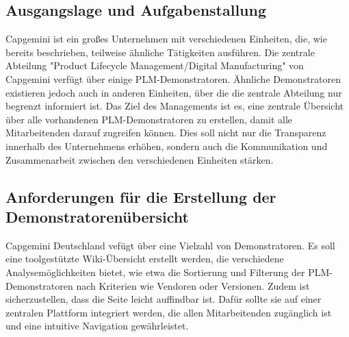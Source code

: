 \documentclass[a4paper, 12pt]{scrartcl}
\begin{document}
	\subsection{Ausgangslage und Aufgabenstallung} %
Capgemini ist ein großes Unternehmen mit verschiedenen Einheiten, die, wie bereits beschrieben, teilweise ähnliche Tätigkeiten ausführen. Die zentrale Abteilung "Product Lifecycle Management/Digital Manufacturing" von Capgemini \cite{Capgemini} verfügt über einige PLM-Demonstratoren. Ähnliche Demonstratoren existieren jedoch auch in anderen Einheiten, über die die zentrale Abteilung nur begrenzt informiert ist.\newline
Das Ziel des Managements ist es, eine zentrale Übersicht über alle vorhandenen PLM-Demonstratoren zu erstellen, damit alle Mitarbeitenden darauf zugreifen können. Dies soll nicht nur die Transparenz innerhalb des Unternehmens erhöhen, sondern auch die Kommunikation und Zusammenarbeit zwischen den verschiedenen Einheiten stärken.
	\subsection{Anforderungen für die Erstellung der Demonstratorenübersicht} %
Capgemini Deutschland vefügt über eine Vielzahl von Demonstratoren. Es soll eine toolgestützte Wiki-Übersicht erstellt werden, die verschiedene Analysemöglichkeiten bietet, wie etwa die Sortierung und Filterung der PLM-Demonstratoren nach Kriterien wie Vendoren oder Versionen.
Zudem ist sicherzustellen, dass die Seite leicht auffindbar ist. Dafür sollte sie auf einer zentralen Plattform integriert werden, die allen Mitarbeitenden zugänglich ist und eine intuitive Navigation gewährleistet.
\end{document}
